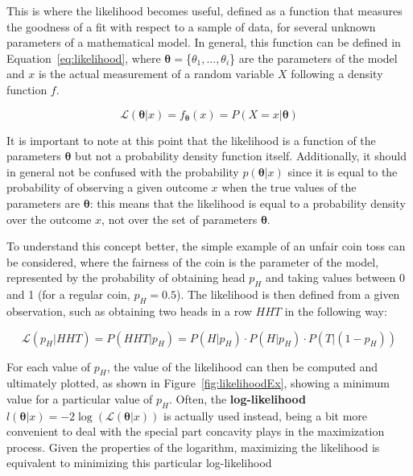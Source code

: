 \documentclass[a4paper, 11pt, twoside, openright]{report}
\begin{document}
This is where the likelihood becomes useful, defined as a function that measures the goodness of a fit with respect to a sample of data, for several unknown parameters of a mathematical model. In general, this function can be defined in Equation~\ref{eq:likelihood}, where $\bm \theta = $\{$\theta_1, ..., \theta_i$\} are the parameters of the model and $x$ is the actual measurement of a random variable $X$ following a density function $f$.

\begin{equation}
\label{eq:likelihood}
\mathcal{L}(\bm \theta | x) = f_{\bm \theta}(x) = P(X = x | \bm \theta)
\end{equation}

It is important to note at this point that the likelihood is a function of the parameters $\bm \theta$ but not a probability density function itself. Additionally, it should in general not be confused with the probability $p(\bm \theta | x)$ since it is equal to the probability of observing a given outcome $x$ when the true values of the parameters are $\bm \theta$: this means that the likelihood is equal to a probability density over the outcome $x$, not over the set of parameters $\bm \theta$.

To understand this concept better, the simple example of an unfair coin toss can be considered, where the fairness of the coin is the parameter of the model, represented by the probability of obtaining head $p_H$ and taking values between 0 and 1 (for a regular coin, $p_H = 0.5$). The likelihood is then defined from a given observation, such as obtaining two heads in a row $HHT$ in the following way:

\begin{equation}
\label{eq:likelihoodEx}
\mathcal{L}(p_H | HHT) = P(HHT | p_H) = P(H | p_H) \cdot P(H | p_H) \cdot P(T | (1-p_H))
\end{equation}

For each value of $p_H$, the value of the likelihood can then be computed and ultimately plotted, as shown in Figure~\ref{fig:likelihoodEx}, showing a minimum value for a particular value of $p_H$. Often, the \textbf{log-likelihood} $l(\bm \theta | x) = -2 \log(\mathcal{L}(\bm \theta | x))$ is actually used instead, being a bit more convenient to deal with the special part concavity plays in the maximization process. Given the properties of the logarithm, maximizing the likelihood is equivalent to minimizing this particular log-likelihood
\end{document}
